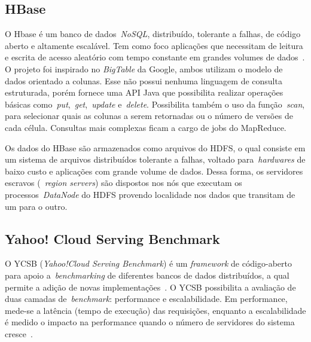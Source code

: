 \documentclass[12pt]{article}
\begin{document}

\subsection{HBase}
\label{subsec:hbase}

O Hbase é um banco de dados~\textit{NoSQL}, distribuído, tolerante a falhas, de código aberto e altamente escalável. Tem como foco aplicações que necessitam de leitura e escrita de acesso aleatório com tempo constante em grandes volumes de dados~\cite{hadoophbase}. O projeto foi inspirado no \textit{BigTable} da Google, ambos utilizam o modelo de dados orientado a colunas. Esse não possui nenhuma linguagem de consulta estruturada, porém fornece uma API Java que possibilita realizar operações básicas como~\emph{put},~\emph{get},~\emph{update} e~\emph{delete}. Possibilita também o uso da função~\emph{scan}, para selecionar quais as colunas a serem retornadas ou o número de versões de cada célula. Consultas mais complexas ficam a cargo de jobs do MapReduce.

Os dados do HBase são armazenados como arquivos do HDFS, o qual consiste em um sistema de arquivos distribuídos tolerante a falhas, voltado para~\emph{hardwares} de baixo custo e aplicações com grande volume de dados. Dessa forma, os servidores escravos (~\emph{region servers}) são dispostos nos nós que executam os processos~\emph{DataNode} do HDFS provendo localidade nos dados que transitam de um para o outro.

\subsection{Yahoo! Cloud Serving Benchmark}
\label{subsec:ycsb}

O YCSB (\emph{Yahoo!Cloud Serving Benchmark}) é um \textit{framework} de código-aberto para apoio a~\emph{benchmarking} de diferentes bancos de dados distribuídos, a qual permite a adição de novas implementações~\cite{cooper2010benchmarking}. 
O YCSB possibilita a avaliação de duas camadas de~\textit{benchmark}: performance e escalabilidade. 
Em performance, mede-se a latência (tempo de execução) das requisições, enquanto a escalabilidade é medido o impacto na performance quando o número de servidores do sistema cresce~\cite{cooper2010benchmarking}.
\end{document}
